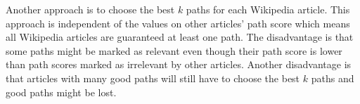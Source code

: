 
Another approach is to choose the best $k$ paths for each Wikipedia article. This approach is independent of the values on other articles' path score which means all Wikipedia articles are guaranteed at least one path. The disadvantage is that some paths might be marked as relevant even though their path score is lower than path scores marked as irrelevant by other articles. Another disadvantage is that articles with many good paths will still have to choose the best $k$ paths and good paths might be lost. 

